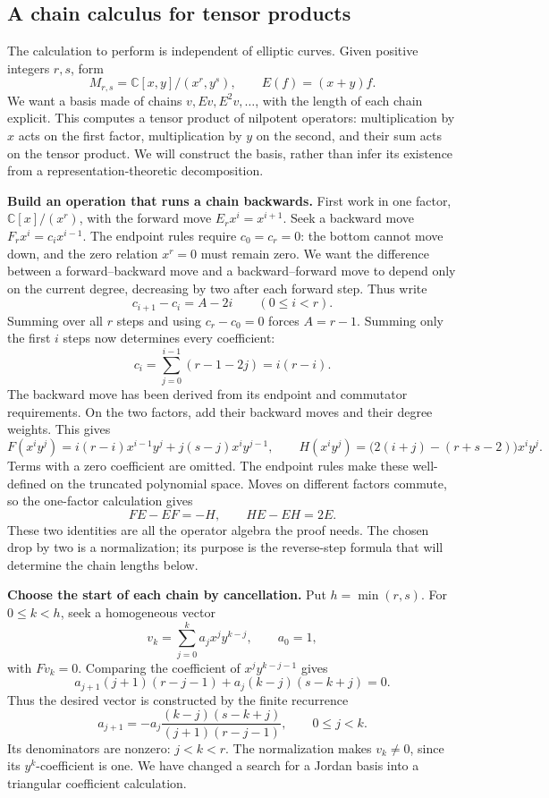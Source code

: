 \documentclass[11pt]{article}
\theoremstyle{remark}
\newcommand{\C}{\mathbb C}
\begin{document}
\subsection{A chain calculus for tensor products}
\label{jordan-tensor-calculus}

The calculation to perform is independent of elliptic curves. Given positive integers \(r,s\), form
\[
M_{r,s}=\C[x,y]/(x^r,y^s),\qquad E(f)=(x+y)f.
\]
We want a basis made of chains \(v,E v,E^2v,\ldots\), with the length of each chain explicit. This computes a tensor product of nilpotent operators: multiplication by \(x\) acts on the first factor, multiplication by \(y\) on the second, and their sum acts on the tensor product. We will construct the basis, rather than infer its existence from a representation-theoretic decomposition.

\textbf{Build an operation that runs a chain backwards.}
First work in one factor, \(\C[x]/(x^r)\), with the forward move \(E_rx^i=x^{i+1}\). Seek a backward move \(F_rx^i=c_i x^{i-1}\). The endpoint rules require \(c_0=c_r=0\): the bottom cannot move down, and the zero relation \(x^r=0\) must remain zero. We want the difference between a forward--backward move and a backward--forward move to depend only on the current degree, decreasing by two after each forward step. Thus write
\[
c_{i+1}-c_i=A-2i\qquad(0\le i<r).
\]
Summing over all \(r\) steps and using \(c_r-c_0=0\) forces \(A=r-1\). Summing only the first \(i\) steps now determines every coefficient:
\[
c_i=\sum_{j=0}^{i-1}(r-1-2j)=i(r-i).
\]
The backward move has been derived from its endpoint and commutator requirements. On the two factors, add their backward moves and their degree weights. This gives
\[
F(x^iy^j)=i(r-i)x^{i-1}y^j+j(s-j)x^iy^{j-1},
\qquad
H(x^iy^j)=\bigl(2(i+j)-(r+s-2)\bigr)x^iy^j.
\]
Terms with a zero coefficient are omitted. The endpoint rules make these well-defined on the truncated polynomial space. Moves on different factors commute, so the one-factor calculation gives
\[
FE-EF=-H,\qquad HE-EH=2E.
\]
These two identities are all the operator algebra the proof needs. The chosen drop by two is a normalization; its purpose is the reverse-step formula that will determine the chain lengths below.

\textbf{Choose the start of each chain by cancellation.}
Put \(h=\min(r,s)\). For \(0\le k<h\), seek a homogeneous vector
\[
v_k=\sum_{j=0}^k a_jx^jy^{k-j},\qquad a_0=1,
\]
with \(Fv_k=0\). Comparing the coefficient of \(x^jy^{k-j-1}\) gives
\[
a_{j+1}(j+1)(r-j-1)+a_j(k-j)(s-k+j)=0.
\]
Thus the desired vector is constructed by the finite recurrence
\[
a_{j+1}=-a_j\frac{(k-j)(s-k+j)}{(j+1)(r-j-1)},
\qquad 0\le j<k.
\]
Its denominators are nonzero: \(j<k<r\). The normalization makes \(v_k\ne0\), since its \(y^k\)-coefficient is one. We have changed a search for a Jordan basis into a triangular coefficient calculation.
\end{document}
